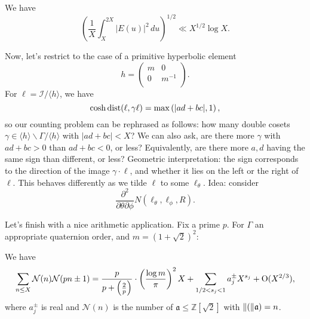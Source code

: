 \documentclass[reqno]{amsart} 
\begin{document}
\begin{theorem}
  We have
  \begin{equation*}
    \left( \frac{1}{X} \int_X^{2 X} \lvert E(u) \rvert^2 \, d u \right)^{1/2} \ll X^{1/2} \log X.
  \end{equation*}  
\end{theorem}

Now, let's restrict to the case of a primitive hyperbolic element
\begin{equation*}
  h =
  \begin{pmatrix}
    m    & 0 \\
    0 & m^{-1} \\
  \end{pmatrix}.
\end{equation*}
For $\ell = \mathcal{I} / \langle h \rangle$, we have
\begin{equation*}
  \cosh \operatorname{dist}(\ell, \gamma \ell) = \max \left( \lvert a d + b c \rvert, 1 \right),
\end{equation*}
so our counting problem can be rephrased as follows: how many double cosets $\gamma \in \langle h \rangle \backslash \Gamma / \langle h \rangle$ with $\lvert a d + b c \rvert < X$?  We can also ask, are there more $\gamma$ with $a d + b c > 0$ than $a d + b c < 0$, or less?  Equivalently, are there more $a, d$ having the same sign than different, or less?  Geometric interpretation: the sign corresponds to the direction of the image $\gamma \cdot \ell$, and whether it lies on the left or the right of $\ell$.  This behaves differently as we tilde $\ell$ to some $\ell_\theta$.  Idea: consider
\begin{equation*}
  \frac{\partial^2}{\partial \theta \partial \phi}
  N(\ell_\theta, \ell_\phi, R).  
\end{equation*}

Let's finish with a nice arithmetic application.  Fix a prime $p$.  For $\Gamma$ an appropriate quaternion order, and $m = \left( 1 + \sqrt{2} \right)^2$:
\begin{theorem}[V.\ 2023, $p=5$; Hejhal 1982]
  We have
  \begin{equation*}
    \sum_{n \leq X} \mathcal{N}(n) \mathcal{N}(p n \pm 1)
    =
    \frac{p}{p + \left( \frac{2}{p} \right)}
    \cdot \left( \frac{\log m}{ \pi} \right)^2 X +
    \sum_{1/2 < s_j < 1}
    a_j^{\pm} X^{s_j} + \operatorname{O}(X^{2/3}),
  \end{equation*}
  where $a_j^{\pm}$ is real and $\mathcal{N}(n)$ is the number of $\mathfrak{a} \leq \mathbb{Z}[\sqrt{2}]$ with $\lVert(\rVert\mathfrak{a}) = n$.
\end{theorem}
\end{document}
